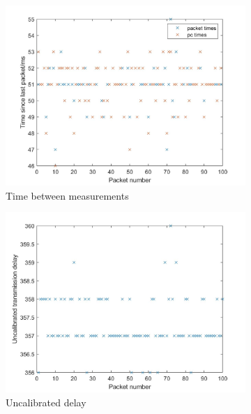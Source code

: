 \documentclass[twoside,twocolumn,12pt]{article}
\begin{document}
\begin{figure}[t]
  \centering
  \begin{subfigure}[t]{0.325\textwidth}
    \includegraphics[width=\linewidth]{timestep}
   \caption{Time between measurements}
  \label{fig:ts}
  \end{subfigure}
  \begin{subfigure}[t]{0.325\textwidth}
    \includegraphics[width=\linewidth]{delay}
    \caption{Uncalibrated delay}
  \label{fig:td}
  \end{subfigure}
  \begin{subfigure}[t]{0.325\textwidth}

\end{subfigure}
\end{figure}
\end{document}
